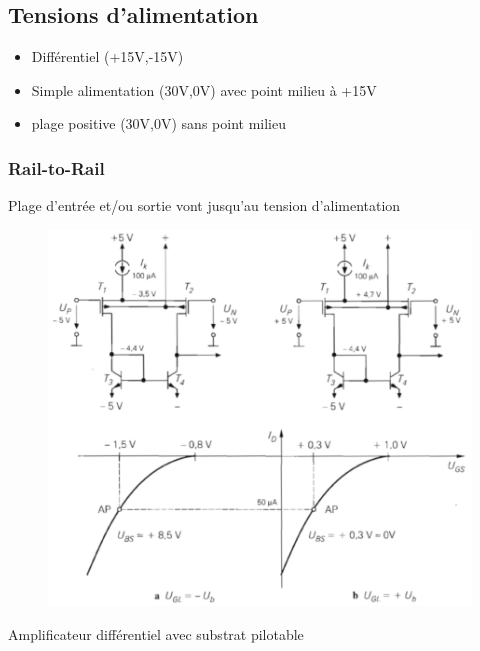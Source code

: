 \documentclass[resume]{subfiles}
\begin{document}
\begin{multicols}{3}
\subsection{Tensions d'alimentation}
\begin{itemize}
\item Différentiel (+15V,-15V)
\item Simple alimentation (30V,0V) avec point milieu à +15V
\item plage positive (30V,0V) sans point milieu
\end{itemize}

\subsubsection{Rail-to-Rail}
Plage d'entrée et/ou sortie vont jusqu'au tension d'alimentation
\begin{figure}[H]
    \centering
    \includegraphics[width=0.8\columnwidth]{../images/OpAmp1/railTorail.png}
\end{figure}
Amplificateur différentiel avec substrat pilotable

\end{multicols}
\end{document}
